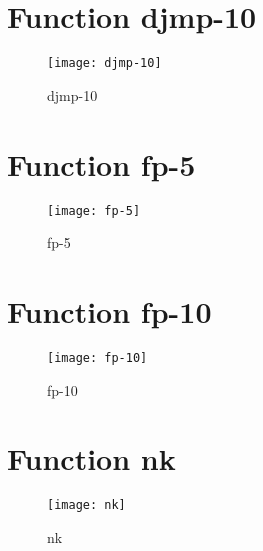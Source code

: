 \section{Function djmp-10}
\begin{center}

\end{center}
\begin{center}

\end{center}
\begin{figure}[h]
\centering
\begin{center}
\texttt{[image: djmp-10]}
\caption{djmp-10}
\end{center}
\end{figure}
\newpage
\section{Function fp-5}
\begin{center}

\end{center}
\begin{center}

\end{center}
\begin{figure}[h]
\centering
\begin{center}
\texttt{[image: fp-5]}
\caption{fp-5}
\end{center}
\end{figure}
\newpage
\section{Function fp-10}
\begin{center}

\end{center}
\begin{center}

\end{center}
\begin{figure}[h]
\centering
\begin{center}
\texttt{[image: fp-10]}
\caption{fp-10}
\end{center}
\end{figure}
\newpage
\section{Function nk}
\begin{center}

\end{center}
\begin{center}

\end{center}
\begin{figure}[h]
\centering
\begin{center}
\texttt{[image: nk]}
\caption{nk}
\end{center}
\end{figure}
\newpage
